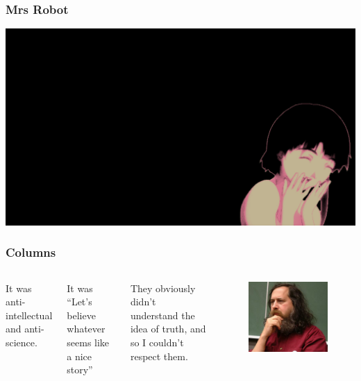 \documentclass{beamer}
\begin{document}
\begin{frame}
  \frametitle{Mrs Robot}
  \includegraphics[width=1\textwidth]{../../pictures/lain.jpg}
\end{frame}

\begin{frame}
  \frametitle{Columns}
  \begin{columns}
    It was anti-intellectual and anti-science.

    It was ``Let's believe whatever seems like a nice story''

    They obviously didn't understand the idea of truth, and so I couldn't
    respect them.
    \begin{figure}[h]
      \begin{center}
        \includegraphics[height=.5\textheight]{../../pictures/saint_ignucius.jpg}
      \end{center}
    \end{figure}
  \end{columns}
\end{frame}
\end{document}
